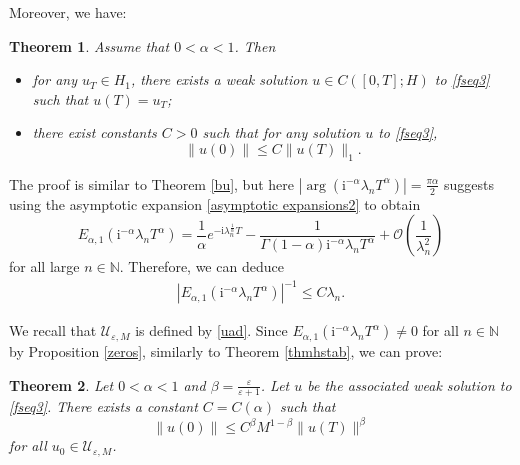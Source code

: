 \documentclass[reqno]{amsart}
\newtheorem{theorem}{Theorem}[section]
\numberwithin{equation}{section}
\begin{document}
Moreover, we have:
\begin{theorem}\label{thmhstabLip22}
Assume that $0<\alpha <1$. Then
\begin{itemize}
    \item[(i)] for any $u_T \in H_1$, there exists a weak solution $u \in C([0, T]; H)$ to \eqref{fseq3} such that $u(T)=u_T$;
    \item[(ii)] there exist constants $C>0$ such that for any solution $u$ to \eqref{fseq3},
		\begin{equation}\label{eqthmlstabLip2}
			\|u(0)\| \le C \|u(T)\|_{1}.
		\end{equation}
\end{itemize}
\end{theorem}
The proof is similar to Theorem \ref{bu}, but here $|\arg(\mathrm{i}^{-\alpha}\lambda_{n} T^{\alpha})|=\frac{\pi \alpha}{2}$ suggests using the asymptotic expansion \eqref{asymptotic expansions2} to obtain
$$
E_{\alpha,1}(\mathrm{i}^{-\alpha}\lambda_nT^{\alpha}) =\frac{1}{\alpha} e^{-\mathrm{i}\lambda_n^{\frac{1}{\alpha}}T}- \frac{1}{\Gamma(1-\alpha)\mathrm{i}^{-\alpha}\lambda_nT^{\alpha}}
+ \mathcal{O}\left(\frac{1}{\lambda_n^2}\right)
$$
for all large $n \in \mathbb{N}$. Therefore, we can deduce
\begin{align*}
\left|E_{\alpha, 1}\left(\mathrm{i}^{-\alpha}\lambda_{n} T^{\alpha}\right)\right|^{-1} 
\le C\lambda_n. 
\end{align*}

We recall that $\mathcal{U}_{\varepsilon,M}$ is defined by \eqref{uad}. Since $E_{\alpha, 1}\left(\mathrm{i}^{-\alpha}\lambda_{n} T^{\alpha}\right)\neq 0$ for all $n\in\mathbb{N}$ by Proposition \ref{zeros}, similarly to Theorem \ref{thmhstab}, we can prove:
\begin{theorem}\label{thmhstab2}
Let $0<\alpha <1$ and $\beta =\frac{\varepsilon}{\varepsilon + 1}$. Let $u$ be the associated weak solution to \eqref{fseq3}. There exists a constant $C=C(\alpha)$ such that
\begin{equation}\label{eqthmhstab2}
    \|u(0)\| \le C^{\beta} M^{1-\beta} \|u(T)\|^{\beta}
\end{equation}
for all $u_0\in \mathcal{U}_{\varepsilon,M}$.
\end{theorem}
\end{document}
